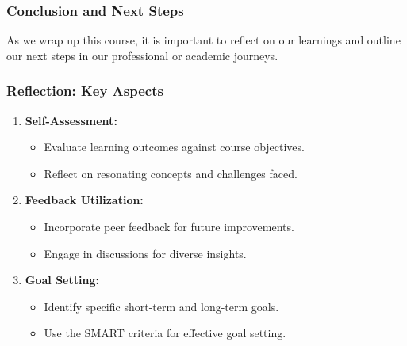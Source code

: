 \documentclass[aspectratio=169]{beamer}
\begin{document}
\begin{frame}[fragile]
    \frametitle{Conclusion and Next Steps}
    As we wrap up this course, it is important to reflect on our learnings and outline our next steps in our professional or academic journeys.
\end{frame}

\begin{frame}[fragile]
    \frametitle{Reflection: Key Aspects}
    \begin{enumerate}
        \item \textbf{Self-Assessment:}
            \begin{itemize}
                \item Evaluate learning outcomes against course objectives.
                \item Reflect on resonating concepts and challenges faced.
            \end{itemize}
        \item \textbf{Feedback Utilization:}
            \begin{itemize}
                \item Incorporate peer feedback for future improvements.
                \item Engage in discussions for diverse insights.
            \end{itemize}
        \item \textbf{Goal Setting:}
            \begin{itemize}
                \item Identify specific short-term and long-term goals.
                \item Use the SMART criteria for effective goal setting.
            \end{itemize}
    \end{enumerate}
\end{frame}
\end{document}
